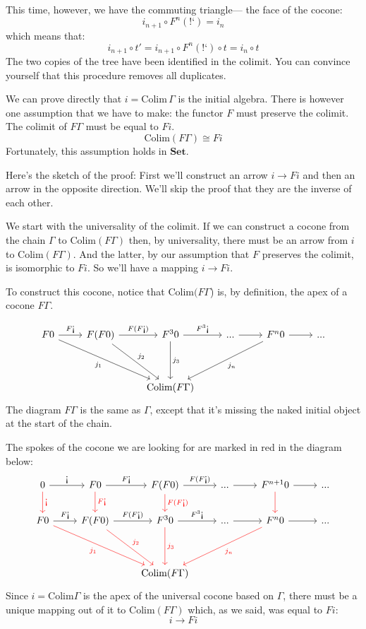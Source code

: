 \documentclass[DaoFP]{subfiles}
\begin{document}
This time, however, we have the commuting triangle--- the face of the cocone:
\[i_{n+1} \circ F^n (\mbox{!`}) = i_n \]
which means that:
\[ i_{n+1} \circ t' =  i_{n+1} \circ F^n (\mbox{!`}) \circ t =  i_n \circ t\]
The two copies of the tree have been identified in the colimit. You can convince yourself that this procedure removes all duplicates.

We can  prove directly that $i = \text{Colim}\, \Gamma$ is the initial algebra. There is however one assumption that we have to make: the functor $F$ must preserve the colimit. The colimit of $F \Gamma$ must be equal to $F i$.
\[ \text{Colim} (F \Gamma) \cong F i \]
Fortunately, this assumption holds in $\mathbf{Set}$. 

Here's the sketch of the proof: First we'll construct an arrow $i \to F i$ and then an arrow in the opposite direction. We'll skip the proof that they are the inverse of each other.

We start with the universality of the colimit. If we can construct a cocone from the chain $\Gamma$ to $\text{Colim} (F \Gamma)$ then, by universality, there must be an arrow from $i$ to $\text{Colim} (F \Gamma)$. And the latter, by our assumption that $F$ preserves the colimit, is isomorphic to $F i$. So we'll have a mapping $i \to F i$.

To construct this cocone, notice that $\text{Colim} (F \Gamma$) is, by definition, the apex of a cocone $F \Gamma$. 

\[
 \begin{tikzcd}
 F 0
 \arrow[r, "F \mbox{!`}"]
 \arrow[ddrr, "j_1"']
 &  F (F 0)
  \arrow[r, "F(F  \mbox{!`})"]
 \arrow[ddr, "j_2"]
& F^3 0
  \arrow[r, "F^3\mbox{!`}"]
  \arrow[dd, "j_3"]
 & ...
 \arrow[r]
 & F^n 0
  \arrow[r]
 \arrow[ddll, "j_n"]
 & ...
 \\
 \\
 &&\text{Colim} (F \Gamma)
  \end{tikzcd}
\]
The diagram $F \Gamma$ is the same as $\Gamma$, except that it's missing the naked initial object at the start of the chain.

The spokes of the cocone we are looking for are marked in red in the diagram below:
\[
 \begin{tikzcd}
 0
 \arrow[r, "\mbox{!`}"]
 \arrow[d, red, "\mbox{!`}"]
 & F 0
  \arrow[r, "F\mbox{!`}"]
  \arrow[d, red, "F\mbox{!`}"]
& F (F 0)
  \arrow[r, "F(F\mbox{!`})"]
  \arrow[d, red, "F(F\mbox{!`})"]
 & ...
 \arrow[r]
 & F^{n+1} 0
  \arrow[r]
  \arrow[d, red]
 & ...
 \\
 F 0
 \arrow[r, "F \mbox{!`}"]
 \arrow[ddrr, red, "j_1"']
 &  F (F 0)
  \arrow[r, "F(F  \mbox{!`})"]
 \arrow[ddr, red, "j_2"]
& F^3 0
  \arrow[r, "F^3\mbox{!`}"]
  \arrow[dd, red, "j_3"]
 & ...
 \arrow[r]
 & F^n 0
  \arrow[r]
 \arrow[ddll, red, "j_n"]
 & ...
 \\
 \\
 &&\text{Colim} (F \Gamma)
  \end{tikzcd}
\]
Since $i = \text{Colim} \Gamma$ is the apex of the universal cocone based on $\Gamma$, there must be a unique mapping out of it to $\text{Colim} (F \Gamma)$ which, as we said, was equal to $F i$:
\[ i \to F i \]
\end{document}
